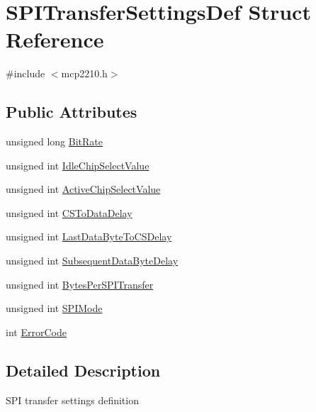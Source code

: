 \hypertarget{struct_s_p_i_transfer_settings_def}{\section{\-S\-P\-I\-Transfer\-Settings\-Def \-Struct \-Reference}
\label{struct_s_p_i_transfer_settings_def}
}


{\ttfamily \#include $<$mcp2210.\-h$>$}

\subsection*{\-Public \-Attributes}
\begin{DoxyCompactItemize}
\item 
unsigned long \hyperlink{struct_s_p_i_transfer_settings_def_a63e79a7391c75e2f16ff51a73fd23638}{\-Bit\-Rate}
\item 
unsigned int \hyperlink{struct_s_p_i_transfer_settings_def_a2f469778bc45bfaae06c0779c53457a9}{\-Idle\-Chip\-Select\-Value}
\item 
unsigned int \hyperlink{struct_s_p_i_transfer_settings_def_a32134013c1180fc4ddcfa42b9e1aeed0}{\-Active\-Chip\-Select\-Value}
\item 
unsigned int \hyperlink{struct_s_p_i_transfer_settings_def_a0e6381f4d265cb73a9589f5e1ba695cf}{\-C\-S\-To\-Data\-Delay}
\item 
unsigned int \hyperlink{struct_s_p_i_transfer_settings_def_a5c05d83e86f6d4cb9437d00a4c7a38a2}{\-Last\-Data\-Byte\-To\-C\-S\-Delay}
\item 
unsigned int \hyperlink{struct_s_p_i_transfer_settings_def_a7692386eb70c3fd674c1a0fdbe7a62c2}{\-Subsequent\-Data\-Byte\-Delay}
\item 
unsigned int \hyperlink{struct_s_p_i_transfer_settings_def_a7f24f8717153d307d02780a27f5bf5dd}{\-Bytes\-Per\-S\-P\-I\-Transfer}
\item 
unsigned int \hyperlink{struct_s_p_i_transfer_settings_def_a362c078515ae312b89face990d02d6c6}{\-S\-P\-I\-Mode}
\item 
int \hyperlink{struct_s_p_i_transfer_settings_def_a06e000b94a109cb22dd362ec768eedc7}{\-Error\-Code}
\end{DoxyCompactItemize}


\subsection{\-Detailed \-Description}
\-S\-P\-I transfer settings definition 

